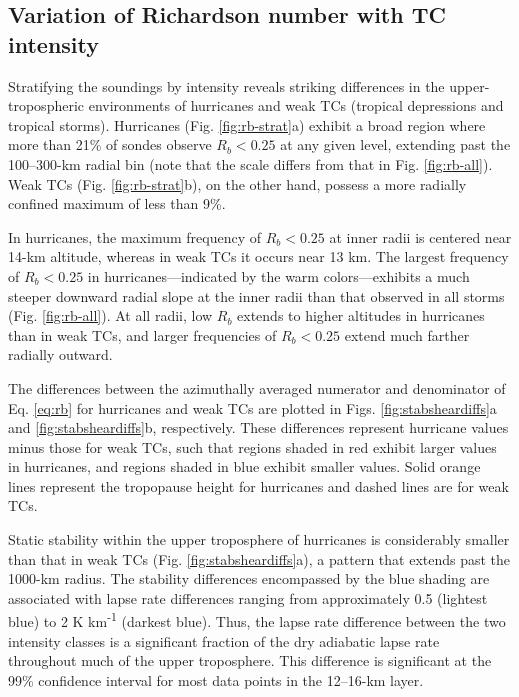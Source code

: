 \subsection{Variation of Richardson number with TC intensity}

Stratifying the soundings by intensity reveals striking differences in the upper-tropospheric environments of hurricanes and weak TCs (tropical depressions and tropical storms).
Hurricanes (Fig. \ref{fig:rb-strat}a) exhibit a broad region where more than 21\% of sondes observe $R_b < 0.25$ at any given level, extending past the 100--300-km radial bin (note that the scale differs from that in Fig. \ref{fig:rb-all}).
Weak TCs (Fig. \ref{fig:rb-strat}b), on the other hand, possess a more radially confined maximum of less than 9\%.

In hurricanes, the maximum frequency of $R_b<0.25$ at inner radii is centered near 14-km altitude, whereas in weak TCs it occurs near 13 km.
The largest frequency of $R_b < 0.25$ in hurricanes---indicated by the warm colors---exhibits a much steeper downward radial slope at the inner radii than that observed in all storms (Fig. \ref{fig:rb-all}).
At all radii, low $R_b$ extends to higher altitudes in hurricanes than in weak TCs, and larger frequencies of $R_b < 0.25$ extend much farther radially outward.

The differences between the azimuthally averaged numerator and denominator of Eq. \ref{eq:rb} for hurricanes and weak TCs are plotted in Figs. \ref{fig:stabsheardiffs}a and \ref{fig:stabsheardiffs}b, respectively.
These differences represent hurricane values minus those for weak TCs, such that regions shaded in red exhibit larger values in hurricanes, and regions shaded in blue exhibit smaller values.
Solid orange lines represent the tropopause height for hurricanes and dashed lines are for weak TCs.

Static stability within the upper troposphere of hurricanes is considerably smaller than that in weak TCs (Fig. \ref{fig:stabsheardiffs}a), a pattern that extends past the 1000-km radius.
The stability differences encompassed by the blue shading are associated with lapse rate differences ranging from approximately 0.5 (lightest blue) to 2 K km\textsuperscript{-1} (darkest blue).
Thus, the lapse rate difference between the two intensity classes is a significant fraction of the dry adiabatic lapse rate throughout much of the upper troposphere.
This difference is significant at the 99\% confidence interval for most data points in the 12–16-km layer.


